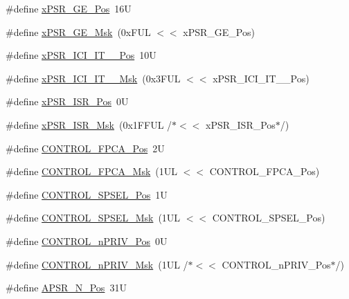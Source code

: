 \begin{DoxyCompactItemize}
\#define \hyperlink{group___c_m_s_i_s___c_o_r_e_gae2b0f3def0f378e9f1d10a4c727a064b}{x\+P\+S\+R\+\_\+\+G\+E\+\_\+\+Pos}~16U
\item 
\#define \hyperlink{group___c_m_s_i_s___c_o_r_e_ga967634e605d013e9b07002eca31f7903}{x\+P\+S\+R\+\_\+\+G\+E\+\_\+\+Msk}~(0x\+F\+U\+L $<$$<$ x\+P\+S\+R\+\_\+\+G\+E\+\_\+\+Pos)
\item 
\#define \hyperlink{group___c_m_s_i_s___c_o_r_e_gafdcd08cbd7116d65ae1a5b8182dc55ae}{x\+P\+S\+R\+\_\+\+I\+C\+I\+\_\+\+I\+T\+\_\+\_\+\+Pos}~10U
\item 
\#define \hyperlink{group___c_m_s_i_s___c_o_r_e_gae98918458d70d79b32ce200b55ffe744}{x\+P\+S\+R\+\_\+\+I\+C\+I\+\_\+\+I\+T\+\_\+\_\+\+Msk}~(0x3\+F\+U\+L $<$$<$ x\+P\+S\+R\+\_\+\+I\+C\+I\+\_\+\+I\+T\+\_\+\_\+\+Pos)
\item 
\#define \hyperlink{group___c_m_s_i_s___c_o_r_e_ga21bff245fb1aef9683f693d9d7bb2233}{x\+P\+S\+R\+\_\+\+I\+S\+R\+\_\+\+Pos}~0U
\item 
\#define \hyperlink{group___c_m_s_i_s___c_o_r_e_gadf8eed87e0081dfe1ef1c78a0ea91afd}{x\+P\+S\+R\+\_\+\+I\+S\+R\+\_\+\+Msk}~(0x1\+F\+F\+U\+L /$\ast$$<$$<$ x\+P\+S\+R\+\_\+\+I\+S\+R\+\_\+\+Pos$\ast$/)
\item 
\#define \hyperlink{group___c_m_s_i_s___c_o_r_e_gac7018b59b07134c5363b33eb94918a58}{C\+O\+N\+T\+R\+O\+L\+\_\+\+F\+P\+C\+A\+\_\+\+Pos}~2U
\item 
\#define \hyperlink{group___c_m_s_i_s___c_o_r_e_gad20bb0212b2e1864f24af38d93587c79}{C\+O\+N\+T\+R\+O\+L\+\_\+\+F\+P\+C\+A\+\_\+\+Msk}~(1\+U\+L $<$$<$ C\+O\+N\+T\+R\+O\+L\+\_\+\+F\+P\+C\+A\+\_\+\+Pos)
\item 
\#define \hyperlink{group___c_m_s_i_s___c_o_r_e_ga07eafc53e609895342c6a530e9d01310}{C\+O\+N\+T\+R\+O\+L\+\_\+\+S\+P\+S\+E\+L\+\_\+\+Pos}~1U
\item 
\#define \hyperlink{group___c_m_s_i_s___c_o_r_e_ga70b29840969b06909da21369b0b05b53}{C\+O\+N\+T\+R\+O\+L\+\_\+\+S\+P\+S\+E\+L\+\_\+\+Msk}~(1\+U\+L $<$$<$ C\+O\+N\+T\+R\+O\+L\+\_\+\+S\+P\+S\+E\+L\+\_\+\+Pos)
\item 
\#define \hyperlink{group___c_m_s_i_s___c_o_r_e_ga51b95bc03ec0d815b459bde0b14a5908}{C\+O\+N\+T\+R\+O\+L\+\_\+n\+P\+R\+I\+V\+\_\+\+Pos}~0U
\item 
\#define \hyperlink{group___c_m_s_i_s___c_o_r_e_gaef3b20d77acb213338f89ce5e7bc36b0}{C\+O\+N\+T\+R\+O\+L\+\_\+n\+P\+R\+I\+V\+\_\+\+Msk}~(1\+U\+L /$\ast$$<$$<$ C\+O\+N\+T\+R\+O\+L\+\_\+n\+P\+R\+I\+V\+\_\+\+Pos$\ast$/)
\item 
\#define \hyperlink{group___c_m_s_i_s___c_o_r_e_gac469528d210043c7bd3f12f0e6824766}{A\+P\+S\+R\+\_\+\+N\+\_\+\+Pos}~31U

\end{DoxyCompactItemize}
